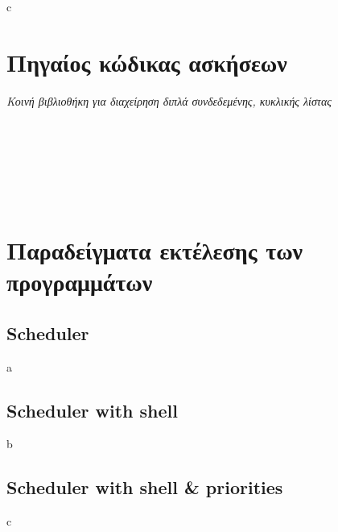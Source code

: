 \documentclass[a4paper,10pt]{article} \usepackage{anysize}
\begin{document}
\subsection{}
c


\vspace{1cm}
\def\thesubsection {Άσκηση \arabic{section}.\arabic{subsection}}
\section*{Πηγαίος κώδικας ασκήσεων}
\emph{Κοινή βιβλιοθήκη για διαχείρηση διπλά συνδεδεμένης, κυκλικής λίστας}
\inputminted[linenos,fontsize=\footnotesize,frame=leftline]{c}{files/queue.h}
\inputminted[linenos,fontsize=\footnotesize,frame=leftline]{c}{files/queue.c}
\setcounter{section}{1}
\setcounter{subsection}{0}
\subsection{}
\inputminted[linenos,fontsize=\footnotesize,frame=leftline]{c}{files/scheduler_1.1.c}
\subsection{}
\inputminted[linenos,fontsize=\footnotesize,frame=leftline]{c}{files/scheduler-shell_1.2.c}
\subsection{}
\inputminted[linenos,fontsize=\footnotesize,frame=leftline]{c}{files/scheduler-shell_1.3.c}

\section*{Παραδείγματα εκτέλεσης των προγραμμάτων}
\def\thesubsection {Πρόγραμμα \arabic{section}.\arabic{subsection}:}
\setcounter{subsection}{0}
\subsection{Scheduler}
a
\subsection{Scheduler with shell}
b
\subsection{Scheduler with shell \& priorities}
c
\end{document}
